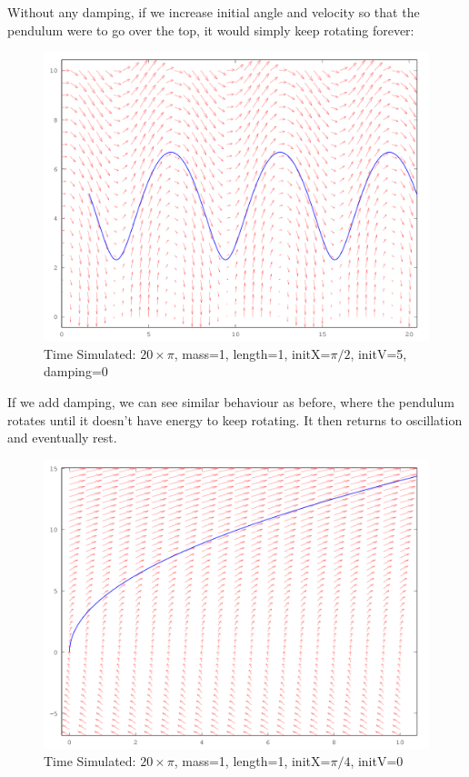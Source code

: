 \documentclass{article}
\begin{document}
Without any damping, if we increase initial angle and velocity so that the pendulum were to go over the top, it would simply keep rotating forever:

\begin{figure}[H]
\caption{Time Simulated: $20\times\pi$, mass=1, length=1, initX=$\pi / 2$, initV=5, damping=0}
\includegraphics[width=\textwidth]{plot10}
\end{figure}

If we add damping, we can see similar behaviour as before, where the pendulum rotates until it doesn't have energy to keep rotating. It then returns to oscillation and eventually rest.

\begin{figure}[H]
\caption{Time Simulated: $20\times\pi$, mass=1, length=1, initX=$\pi / 4$, initV=0}
\includegraphics[width=\textwidth]{plot11}
\end{figure}
\end{document}
